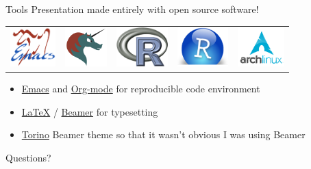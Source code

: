 \documentclass[sans,aspectratio=169,presentation,bigger,fleqn]{beamer}
\begin{document}
\begin{frame}[label=sec-26]{Tools}
Presentation made entirely with open source software!

\begin{center}
\begin{center}
\begin{tabular}{lllll}
\includegraphics[height=1.5cm]{./img/emacs.png} & \includegraphics[height=1.5cm]{./img/org-mode.png} & \includegraphics[height=1.5cm]{./img/r.png} & \includegraphics[height=1.5cm]{./img/r-studio.png} & \includegraphics[height=1.5cm]{./img/arch.png}\\
\end{tabular}
\end{center}
\end{center}

\begin{itemize}
\item \href{http://www.gnu.org/software/emacs/}{Emacs} and \href{http://orgmode.org/}{Org-mode} for reproducible code environment
\item \href{http://www.latex-project.org/}{\LaTeX} / \href{http://www.ctan.org/tex-archive/macros/latex/contrib/beamer/}{Beamer} for typesetting
\item \href{http://blog.barisione.org/2007-09/torino-a-pretty-theme-for-latex-beamer/}{Torino} Beamer theme so that it wasn't obvious I was using Beamer
\end{itemize}
\end{frame}

\begin{frame}[label=sec-27]{}
\LARGE
\begin{center}
Questions?
\end{center}
\end{frame}
\end{document}
